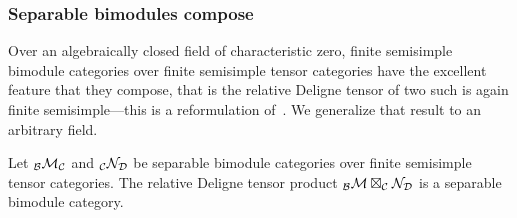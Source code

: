 \documentclass{amsart}
\begin{document}


\subsubsection{Separable bimodules compose}

Over an algebraically closed field of characteristic zero, finite semisimple bimodule categories over finite semisimple tensor categories have the excellent feature that they compose, that is the relative Deligne tensor of two such is again finite semisimple---this is a reformulation of~\cite[Theorem 2.16]{MR2183279}.  We generalize that result to an arbitrary field. 
\begin{theorem} \label{thm:compositeOfSep}
Let ${}_\mathcal B \mathcal M_\mathcal C$ and ${}_\mathcal C \mathcal N_\mathcal D$ be separable bimodule categories over finite semisimple tensor categories.  The relative Deligne tensor product ${}_{\mathcal B} \mathcal M \boxtimes_\mathcal C \mathcal N_\mathcal D$ is a separable bimodule category.
\end{theorem}
\end{document}
